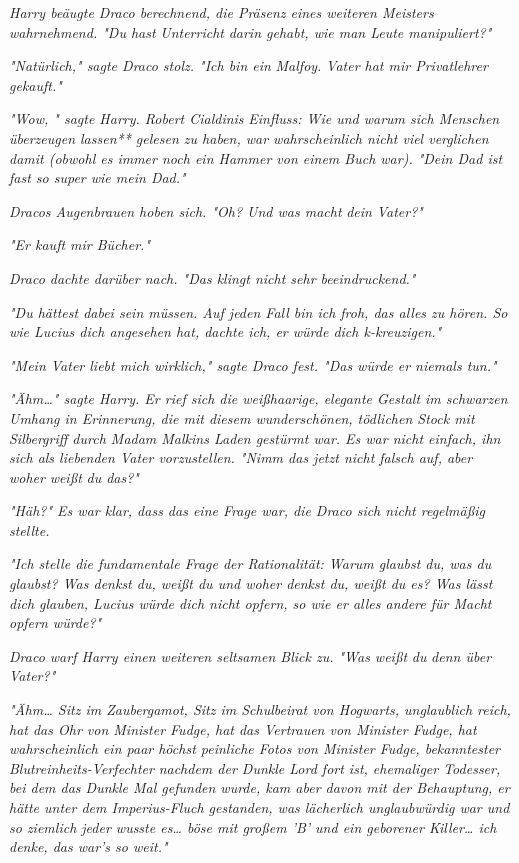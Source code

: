 {\emph{Harry beäugte Draco berechnend, die Präsenz eines weiteren Meisters wahrnehmend. "Du hast} \emph{\emph{Unterricht}} \emph{darin gehabt, wie man Leute manipuliert?"}

\emph{"Natürlich," sagte Draco stolz. "Ich bin ein} \emph{\emph{Malfoy.}} \emph{Vater hat mir Privatlehrer gekauft."}

\emph{"Wow, " sagte Harry. Robert Cialdinis} \emph{\emph{Einfluss: Wie und warum sich Menschen überzeugen lassen}** gelesen zu haben, war wahrscheinlich nicht viel verglichen damit (obwohl es immer noch ein Hammer von einem Buch war). "Dein Dad ist fast so super wie mein Dad."}

\emph{Dracos Augenbrauen hoben sich. "Oh? Und was macht} \emph{\emph{dein}} \emph{Vater?"}

\emph{"Er kauft mir Bücher."}

\emph{Draco dachte darüber nach. "Das klingt nicht sehr beeindruckend."}

\emph{"Du hättest dabei sein müssen. Auf jeden Fall bin ich froh, das alles zu hören. So wie Lucius dich angesehen hat, dachte ich, er würde dich k-kreuzigen."}

\emph{"Mein Vater liebt mich wirklich," sagte Draco fest. "Das würde er niemals tun."}

\emph{"Ähm…" sagte Harry. Er rief sich die weißhaarige, elegante Gestalt im schwarzen Umhang in Erinnerung, die mit diesem wunderschönen, tödlichen Stock mit Silbergriff durch Madam Malkins Laden gestürmt war. Es war nicht einfach, ihn sich als liebenden Vater vorzustellen. "Nimm das jetzt nicht falsch auf, aber woher} \emph{\emph{weißt}} \emph{du das?"}

\emph{"Häh?" Es war klar, dass das eine Frage war, die Draco sich nicht regelmäßig stellte.}

\emph{"Ich stelle die fundamentale Frage der Rationalität: Warum glaubst du, was du glaubst? Was denkst du, weißt du und woher denkst du, weißt du es? Was lässt dich glauben, Lucius würde dich nicht opfern, so wie er alles andere für Macht opfern würde?"}

\emph{Draco warf Harry einen weiteren seltsamen Blick zu. "Was weißt} \emph{\emph{du}} \emph{denn über Vater?"}

\emph{"Ähm… Sitz im Zaubergamot, Sitz im Schulbeirat von Hogwarts, unglaublich reich, hat das Ohr von Minister Fudge, hat das Vertrauen von Minister Fudge, hat wahrscheinlich ein paar höchst peinliche Fotos von Minister Fudge, bekanntester} \emph{Blutreinheits-Verfechter} \emph{nachdem der Dunkle Lord fort ist, ehemaliger Todesser, bei dem das Dunkle Mal gefunden wurde, kam aber davon mit der Behauptung, er hätte unter dem Imperius-Fluch gestanden, was lächerlich unglaubwürdig war und so ziemlich jeder wusste es… böse mit großem 'B' und ein geborener Killer… ich denke, das war's so weit."}

}
